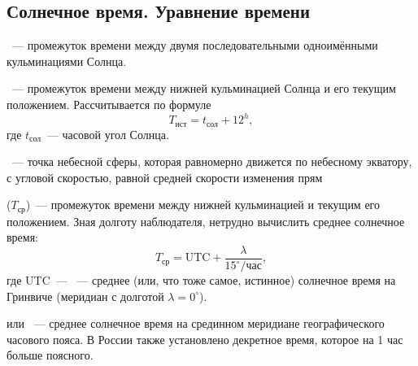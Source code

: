 \subsection{Солнечное время. Уравнение времени}



~--- промежуток времени между двумя последовательными одноимёнными кульминациями Солнца.

~--- промежуток времени между нижней кульминацией Солнца и его текущим положением. Рассчитывается по формуле
\begin{equation}
	T_{\text{ист}} = t_{\text{сол}}+12^h,
\end{equation}
где $t_{\text{сол}}$~--- часовой угол Солнца.

~--- точка небесной сферы, которая равномерно движется по небесному экватору, с угловой скоростью, равной средней скорости изменения прям

 ($T_\text{ср}$)~--- промежуток времени между нижней кульминацией  и текущим его положением.  Зная долготу наблюдателя, нетрудно вычислить среднее солнечное время:
\begin{equation*}
	T_\text{ср} = \text{UTC} + \frac{\lambda}{15^\circ/\text{час}},
\end{equation*}
где UTC~--- ~--- среднее (или, что тоже самое, истинное) солнечное время на Гринвиче (меридиан с долготой $\lambda = 0^\circ$).

 или ~--- среднее солнечное время на срединном меридиане географического часового пояса. В России также установлено декретное время, которое на 1 час больше поясного.

